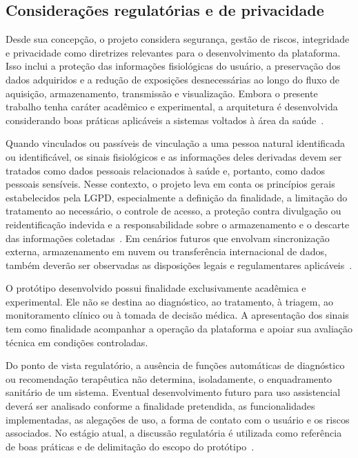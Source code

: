 \documentclass[a4paper,12pt]{fcte}
\begin{document}
\subsection{Considerações regulatórias e de privacidade}

Desde sua concepção, o projeto considera segurança, gestão de riscos, integridade e privacidade como diretrizes relevantes para o desenvolvimento da plataforma. Isso inclui a proteção das informações fisiológicas do usuário, a preservação dos dados adquiridos e a redução de exposições desnecessárias ao longo do fluxo de aquisição, armazenamento, transmissão e visualização. Embora o presente trabalho tenha caráter acadêmico e experimental, a arquitetura é desenvolvida considerando boas práticas aplicáveis a sistemas voltados à área da saúde~\cite{anvisa_guia38,anvisa_manual2026}.

Quando vinculados ou passíveis de vinculação a uma pessoa natural identificada ou identificável, os sinais fisiológicos e as informações deles derivadas devem ser tratados como dados pessoais relacionados à saúde e, portanto, como dados pessoais sensíveis. Nesse contexto, o projeto leva em conta os princípios gerais estabelecidos pela LGPD, especialmente a definição da finalidade, a limitação do tratamento ao necessário, o controle de acesso, a proteção contra divulgação ou reidentificação indevida e a responsabilidade sobre o armazenamento e o descarte das informações coletadas~\cite{lgpd_planalto}. Em cenários futuros que envolvam sincronização externa, armazenamento em nuvem ou transferência internacional de dados, também deverão ser observadas as disposições legais e regulamentares aplicáveis~\cite{lgpd_planalto}.

O protótipo desenvolvido possui finalidade exclusivamente acadêmica e experimental. Ele não se destina ao diagnóstico, ao tratamento, à triagem, ao monitoramento clínico ou à tomada de decisão médica. A apresentação dos sinais tem como finalidade acompanhar a operação da plataforma e apoiar sua avaliação técnica em condições controladas.

Do ponto de vista regulatório, a ausência de funções automáticas de diagnóstico ou recomendação terapêutica não determina, isoladamente, o enquadramento sanitário de um sistema. Eventual desenvolvimento futuro para uso assistencial deverá ser analisado conforme a finalidade pretendida, as funcionalidades implementadas, as alegações de uso, a forma de contato com o usuário e os riscos associados. No estágio atual, a discussão regulatória é utilizada como referência de boas práticas e de delimitação do escopo do protótipo~\cite{anvisa_rdc657_qa,anvisa_manual2026}.
\end{document}
